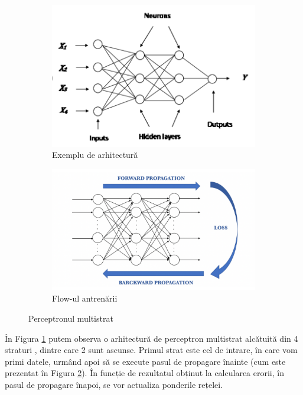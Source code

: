 \documentclass[a4paper,12pt]{report}
\begin{document}
   \begin{figure}[H]
   		\begin{subfigure}[b]{0.57\textwidth}
   			\includegraphics[width=\textwidth]{images/mlp.PNG}
   			\caption{Exemplu de arhitectură}
   			\label{fig:arhitectura}
   		\end{subfigure}
   		\hfill
	   	\begin{subfigure}[b]{0.57\textwidth}
	   		\includegraphics[width=\textwidth]{images/back_propagation.PNG}
	   		\caption{Flow-ul antrenării}
	   		\label{fig:flow_antrenare}
	   	\end{subfigure}
   	\caption{Perceptronul multistrat}
   	\label{fig:arhitectura_flow}
   \end{figure}

    În Figura \ref{fig:arhitectura} putem observa o arhitectură de perceptron multistrat alcătuită din 4 straturi , dintre care 2 sunt ascunse. Primul strat este cel de intrare, în care vom primi datele, urmând apoi să se execute pasul de propagare înainte (cum este prezentat în Figura \ref{fig:flow_antrenare}). În funcție de rezultatul obținut la calcularea erorii, în pasul de propagare înapoi, se vor actualiza ponderile rețelei.
   
\end{document}
